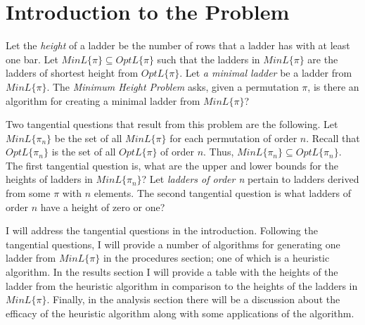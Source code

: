 \section{Introduction to the Problem}
Let the \emph{height} of a ladder be the number of rows that a ladder has with at least one bar. 
Let $MinL\{\pi\} \subseteq OptL\{\pi\}$ such that the ladders in $MinL\{\pi\}$ are the ladders of shortest height from 
$OptL\{\pi\}$.  Let \emph{a minimal ladder} be a ladder from $MinL\{\pi\}$. The \emph{Minimum Height Problem} asks, 
given a permutation $\pi$, is there an algorithm for creating a minimal ladder
from $MinL\{\pi\}$?\par  
Two tangential questions that result from this problem are the following. Let $MinL\{\pi_{n}\}$ 
be the set of all $MinL\{\pi\}$ for each permutation of order $n$. Recall that $OptL\{\pi_{n}\}$ is the set of all 
$OptL\{\pi\}$ of order $n$. Thus, $MinL\{\pi_{n}\} \subseteq OptL\{\pi_{n}\}$.  The first tangential question is, 
what are the upper and lower bounds for the heights of ladders in $MinL\{\pi_{n}\}$? 
Let \emph{ladders of order n} pertain to ladders derived from some $\pi$ with $n$ elements.
The second tangential question is what ladders of order $n$ have a height of zero or one? \par 


I will address the tangential questions in the introduction. Following the tangential questions, 
I will provide a number of algorithms for generating one ladder from $MinL\{\pi\}$ in the procedures section; one 
of which is a heuristic algorithm. 
In the results section I will provide a table with the heights of the ladder from the heuristic 
algorithm in comparison to the heights of the ladders
in $MinL\{\pi\}$. Finally, in the analysis section there will be a discussion 
about the efficacy of the heuristic algorithm along with some applications of the algorithm.\par 



